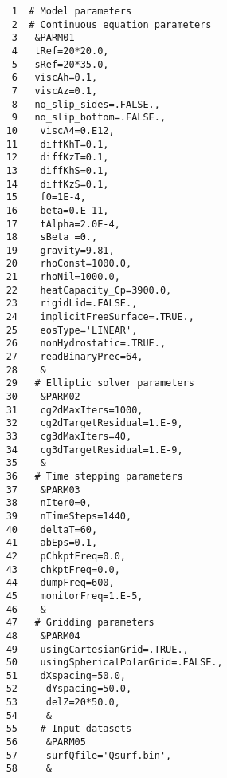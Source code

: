 \begin{verbatim}
     1	# Model parameters 
     2	# Continuous equation parameters
     3	 &PARM01
     4	 tRef=20*20.0,
     5	 sRef=20*35.0,
     6	 viscAh=0.1,
     7	 viscAz=0.1,
     8	 no_slip_sides=.FALSE.,
     9	 no_slip_bottom=.FALSE.,
    10	  viscA4=0.E12,
    11	  diffKhT=0.1,
    12	  diffKzT=0.1,
    13	  diffKhS=0.1,
    14	  diffKzS=0.1,
    15	  f0=1E-4,
    16	  beta=0.E-11,
    17	  tAlpha=2.0E-4,
    18	  sBeta =0.,
    19	  gravity=9.81,
    20	  rhoConst=1000.0,
    21	  rhoNil=1000.0,
    22	  heatCapacity_Cp=3900.0,
    23	  rigidLid=.FALSE.,
    24	  implicitFreeSurface=.TRUE.,
    25	  eosType='LINEAR',
    26	  nonHydrostatic=.TRUE.,
    27	  readBinaryPrec=64,
    28	  &
    29	 # Elliptic solver parameters
    30	  &PARM02
    31	  cg2dMaxIters=1000,
    32	  cg2dTargetResidual=1.E-9,
    33	  cg3dMaxIters=40,
    34	  cg3dTargetResidual=1.E-9,
    35	  &
    36	 # Time stepping parameters
    37	  &PARM03
    38	  nIter0=0,
    39	  nTimeSteps=1440,
    40	  deltaT=60,
    41	  abEps=0.1,
    42	  pChkptFreq=0.0,
    43	  chkptFreq=0.0,
    44	  dumpFreq=600,
    45	  monitorFreq=1.E-5,
    46	  &
    47	 # Gridding parameters
    48	  &PARM04
    49	  usingCartesianGrid=.TRUE.,
    50	  usingSphericalPolarGrid=.FALSE.,
    51	  dXspacing=50.0,
    52	   dYspacing=50.0,
    53	   delZ=20*50.0,
    54	   &
    55	  # Input datasets
    56	   &PARM05
    57	   surfQfile='Qsurf.bin',
    58	   &
\end{verbatim}
